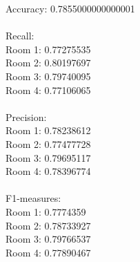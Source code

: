 \documentclass{article}
\begin{document}
Accuracy: 0.7855000000000001 \\
\\
Recall: \\
Room 1: 0.77275535 \\
Room 2: 0.80197697 \\
Room 3: 0.79740095 \\
Room 4: 0.77106065 \\
\\
Precision: \\
Room 1: 0.78238612 \\
Room 2: 0.77477728 \\
Room 3: 0.79695117 \\
Room 4: 0.78396774 \\
\\
F1-measures: \\
Room 1: 0.7774359 \\
Room 2: 0.78733927  \\
Room 3: 0.79766537 \\
Room 4: 0.77890467 \\
\end{document}
